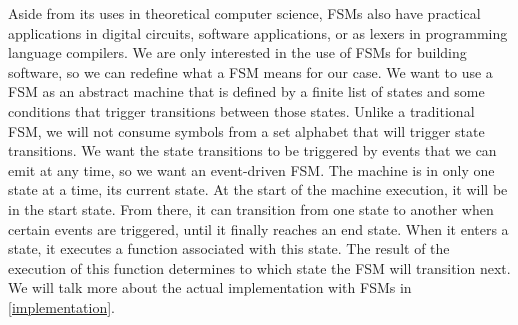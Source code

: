 Aside from its uses in theoretical computer science, FSMs also have practical applications in digital circuits, software applications, or as lexers in programming language compilers.
We are only interested in the use of FSMs for building software, so we can redefine what a FSM means for our case.
We want to use a FSM as an abstract machine that is defined by a finite list of states and some conditions that trigger transitions between those states.
Unlike a traditional FSM, we will not consume symbols from a set alphabet that will trigger state transitions.
We want the state transitions to be triggered by events that we can emit at any time, so we want an event-driven FSM.
The machine is in only one state at a time, its current state.
At the start of the machine execution, it will be in the start state.
From there, it can transition from one state to another when certain events are triggered, until it finally reaches an end state.
When it enters a state, it executes a function associated with this state.
The result of the execution of this function determines to which state the FSM will transition next.
We will talk more about the actual implementation with FSMs in \autoref{implementation}.
